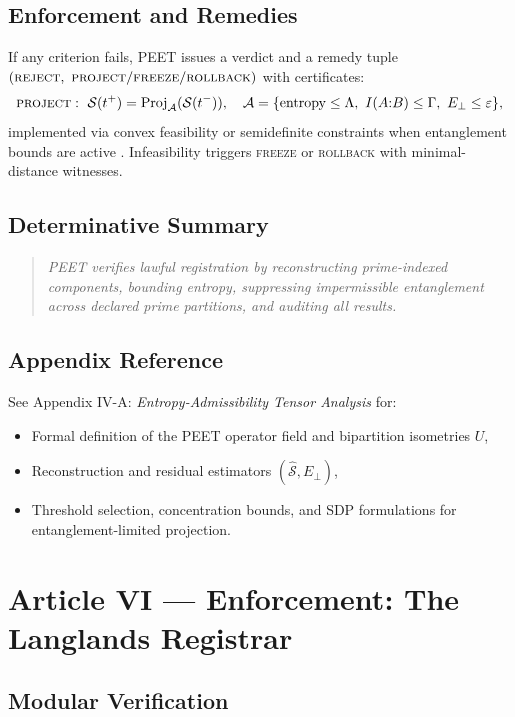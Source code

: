 \documentclass[12pt]{amsart}
\theoremstyle{plain}
\begin{document}
\subsection{Enforcement and Remedies}

If any criterion fails, PEET issues a verdict and a remedy tuple $(\textsc{reject},\ \textsc{project}/\textsc{freeze}/\textsc{rollback})$ with certificates:
\[
\textsc{project}:\ \mathcal{S}(t^+)=\operatorname{Proj}_{\mathcal{A}}(\mathcal{S}(t^-)),\quad
\mathcal{A}=\{\text{entropy}\le\Lambda,\ I(A{:}B)\le\Gamma,\ E_\perp\le\varepsilon\},
\]
implemented via convex feasibility or semidefinite constraints when entanglement bounds are active \cite{boyd2004convex}. Infeasibility triggers \textsc{freeze} or \textsc{rollback} with minimal-distance witnesses.

\subsection{Determinative Summary}

\begin{quote}
\textit{PEET verifies lawful registration by reconstructing prime-indexed components, bounding entropy, suppressing impermissible entanglement across declared prime partitions, and auditing all results.}
\end{quote}

\subsection*{Appendix Reference}

See Appendix IV-A: \emph{Entropy-Admissibility Tensor Analysis} for:
\begin{itemize}
  \item Formal definition of the PEET operator field and bipartition isometries $U$,
  \item Reconstruction and residual estimators $(\widehat{\mathcal{S}},E_\perp)$,
  \item Threshold selection, concentration bounds, and SDP formulations for entanglement-limited projection.
\end{itemize}

\section{Article VI — Enforcement: The Langlands Registrar}

\subsection{Modular Verification}
\end{document}
